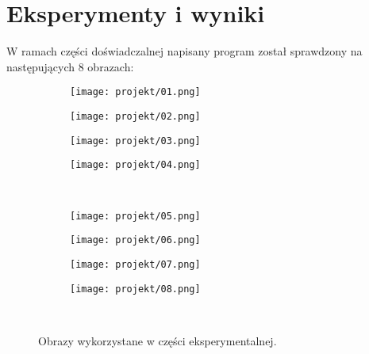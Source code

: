 \documentclass[12pt]{article}
\begin{document}

\newpage
\section{Eksperymenty i wyniki}

W ramach części doświadczalnej napisany program został sprawdzony na następujących 8 obrazach:



\begin{figure}[H]
\renewcommand*\thesubfigure{0\arabic{subfigure}} 
\centering
 \begin{subfigure}[b]{.24\linewidth}
   \centering
   \texttt{[image: projekt/01.png]}
   \caption{}\label{fig:a_2}
 \end{subfigure}%
  \begin{subfigure}[b]{.24\linewidth}
   \centering
   \texttt{[image: projekt/02.png]}
   \caption{}\label{fig:a_4}
 \end{subfigure}%
  \begin{subfigure}[b]{.24\linewidth}
   \centering
   \texttt{[image: projekt/03.png]}
   \caption{}\label{fig:a_6}
 \end{subfigure}%
  \begin{subfigure}[b]{.24\linewidth}
   \centering
   \texttt{[image: projekt/04.png]}
   \caption{}\label{fig:a_8}
 \end{subfigure}\\%
 \begin{subfigure}[b]{.24\linewidth}
   \centering
   \texttt{[image: projekt/05.png]}
   \caption{}\label{fig:a_10}
 \end{subfigure}%
  \begin{subfigure}[b]{.24\linewidth}
   \centering
   \texttt{[image: projekt/06.png]}
   \caption{}\label{fig:a_12}
 \end{subfigure}%
  \begin{subfigure}[b]{.24\linewidth}
   \centering
   \texttt{[image: projekt/07.png]}
   \caption{}\label{fig:a_20}
 \end{subfigure}%
  \begin{subfigure}[b]{.24\linewidth}
   \centering
   \texttt{[image: projekt/08.png]}
   \caption{}\label{fig:a_30}
 \end{subfigure}\\%
 \caption{Obrazy wykorzystane w części eksperymentalnej.}\label{obrazy}
\end{figure}
\end{document}
